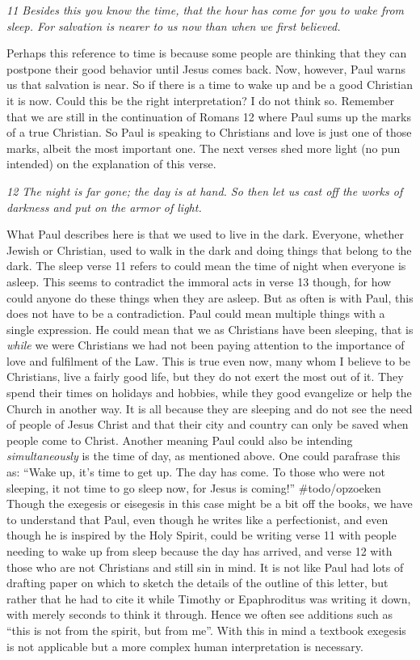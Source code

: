 \emph{11 Besides this you know the time, that the hour has come for you
to wake from sleep. For salvation is nearer to us now than when we
first believed.}

Perhaps this reference to time is because some people are thinking that
they can postpone their good behavior until Jesus comes back. Now,
however, Paul warns us that salvation is near. So if there is a time to
wake up and be a good Christian it is now. Could this be the right
interpretation? I do not think so. Remember that we are still in the
continuation of Romans 12 where Paul sums up the marks of a true
Christian. So Paul is speaking to Christians and love is just one of
those marks, albeit the most important one. The next verses shed more
light (no pun intended) on the explanation of this verse.

\emph{12 The night is far gone; the day is at hand. So then let us cast
off the works of darkness and put on the armor of light.}

What Paul describes here is that we used to live in the dark. Everyone,
whether Jewish or Christian, used to walk in the dark and doing things
that belong to the dark. The sleep verse 11 refers to could mean the
time of night when everyone is asleep. This seems to contradict the
immoral acts in verse 13 though, for how could anyone do these things
when they are asleep. But as often is with Paul, this does not have to
be a contradiction. Paul could mean multiple things with a single
expression. He could mean that we as Christians have been sleeping, that
is \emph{while} we were Christians we had not been paying attention to
the importance of love and fulfilment of the Law. This is true even now,
many whom I believe to be Christians, live a fairly good life, but they
do not exert the most out of it. They spend their times on holidays and
hobbies, while they good evangelize or help the Church in another way.
It is all because they are sleeping and do not see the need of people of
Jesus Christ and that their city and country can only be saved when
people come to Christ. Another meaning Paul could also be intending
\emph{simultaneously} is the time of day, as mentioned above. One could
parafrase this as: ``Wake up, it's time to get up. The day has come. To
those who were not sleeping, it not time to go sleep now, for Jesus is
coming!'' \#todo/opzoeken Though the exegesis or eisegesis in this case
might be a bit off the books, we have to understand that Paul, even
though he writes like a perfectionist, and even though he is inspired by
the Holy Spirit, could be writing verse 11 with people needing to wake
up from sleep because the day has arrived, and verse 12 with those who
are not Christians and still sin in mind. It is not like Paul had lots
of drafting paper on which to sketch the details of the outline of this
letter, but rather that he had to cite it while Timothy or Epaphroditus
was writing it down, with merely seconds to think it through. Hence we
often see additions such as ``this is not from the spirit, but from
me''. With this in mind a textbook exegesis is not applicable but a more
complex human interpretation is necessary.

